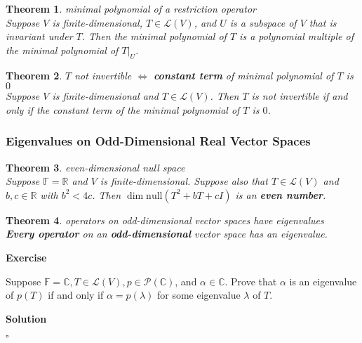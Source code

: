 \documentclass{article}
\newtheorem{theorem}{Theorem}[subsection]
\newenvironment{exercise}{%
{\textbf{Exercise\\}
    }
}{
}
\newenvironment{solution}{%
{
    \textbf{Solution\\}
    }
}{
  \hfill $\square$ 
  \par\bigskip 
}
\newcommand{\RR}{\mathbb{R}}
\newcommand{\CC}{\mathbb{C}}
\newcommand{\FF}{\mathbb{F}}
\newcommand{\n}{\text{null}}
\begin{document}
\begin{CJK}{UTF8}{gkai}
\begin{theorem}
    minimal polynomial of a restriction operator\\

 Suppose $V$ is finite-dimensional, $T \in \mathcal{L}(V)$, and $U$ is a subspace of $V$ that is invariant under $T$. Then the minimal polynomial of $T$ is a polynomial multiple of the minimal polynomial of $T|_U$.
\end{theorem}

\begin{theorem}
    $T$ not invertible $\Leftrightarrow$ \textbf{constant term} of minimal polynomial of $T$ is $0$\\

    Suppose $V$ is finite-dimensional and $T \in \mathcal{L}(V)$. Then $T$ is not invertible if and only if the constant term of the minimal polynomial of $T$ is $0$.
\end{theorem}

\subsubsection{Eigenvalues on Odd-Dimensional Real Vector Spaces}

\begin{theorem}
    even-dimensional null space\\

    Suppose $\FF = \RR$ and $V$ is finite-dimensional. Suppose also that $T \in \mathcal{L}(V)$ and $b,c \in \RR$ with $b^2 < 4c$. Then $\dim \n (T^2 +bT+cI)$ is an \textbf{even number}.
\end{theorem}

\begin{theorem}
    operators on odd-dimensional vector spaces have eigenvalues\\

    \textbf{Every operator} on an \textbf{odd-dimensional} vector space has an eigenvalue.\\
\end{theorem}


\begin{exercise}
    Suppose $\FF = \CC, T \in \mathcal{L}(V), p \in \mathcal{P}(\CC)$, and $\alpha \in \CC$. Prove that $\alpha$ is an eigenvalue of $p(T)$ if and only if $\alpha = p(\lambda)$ for some eigenvalue $\lambda$ of $T$.
\end{exercise}

\begin{solution}


\end{solution}
\end{CJK}
\end{document}
